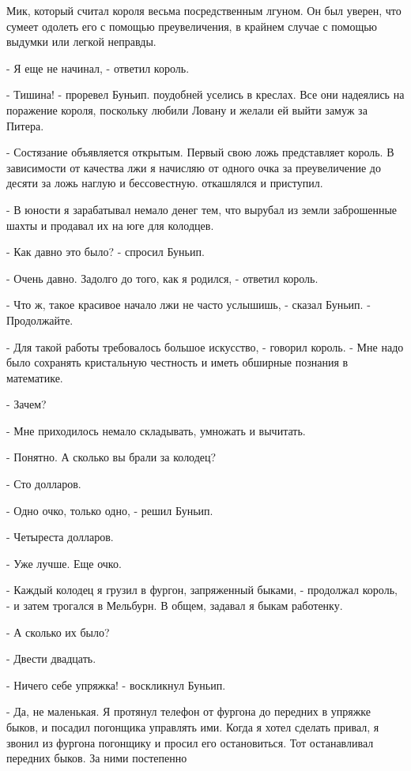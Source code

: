 Мик, который считал короля весьма посредственным лгуном. Он был 
уверен, что сумеет одолеть его с помощью преувеличения, в крайнем 
случае с помощью выдумки или легкой неправды.
\par- Я еще не начинал, - ответил король.
\par- Тишина! - проревел Буньип.
 поудобней уселись в креслах. Все они надеялись на 
поражение короля, поскольку любили Ловану и желали ей выйти замуж за 
Питера.
\par- Состязание объявляется открытым. Первый свою ложь представляет 
король. В зависимости от качества лжи я начисляю от одного очка за 
преувеличение до десяти за ложь наглую и бессовестную.
 откашлялся и приступил.
\par- В юности я зарабатывал немало денег тем, что вырубал из земли 
заброшенные шахты и продавал их на юге для колодцев.
\par- Как давно это было? - спросил Буньип.
\par- Очень давно. Задолго до того, как я родился, - ответил король.
\par- Что ж, такое красивое начало лжи не часто услышишь, - сказал 
Буньип. - Продолжайте.
\par- Для такой работы требовалось большое искусство, - говорил 
король. - Мне надо было сохранять кристальную честность и иметь 
обширные познания в математике.
\par- Зачем?
\par- Мне приходилось немало складывать, умножать и вычитать.
\par- Понятно. А сколько вы брали за колодец?
\par- Сто долларов.
\par- Одно очко, только одно, - решил Буньип.
\par- Четыреста долларов.
\par- Уже лучше. Еще очко.
\par- Каждый колодец я грузил в фургон, запряженный быками, - 
продолжал король, - и затем трогался в Мельбурн. В общем, задавал я 
быкам работенку.
\par- А сколько их было?
\par- Двести двадцать.
\par- Ничего себе упряжка! - воскликнул Буньип.
\par- Да, не маленькая. Я протянул телефон от фургона до передних в 
упряжке быков, и посадил погонщика управлять ими. Когда я хотел 
сделать привал, я звонил из фургона погонщику и просил его 
остановиться. Тот останавливал передних быков. За ними постепенно 
